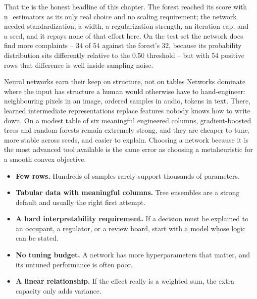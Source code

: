 That tie is the honest headline of this chapter. The forest reached its score
with \c{n_estimators} as its only real choice and no scaling requirement; the
network needed standardization, a width, a regularization strength, an
iteration cap, and a seed, and it repays none of that effort here. On the test
set the network does find more complaints -- 34 of 54 against the forest's 32,
because its probability distribution sits differently relative to the 0.50
threshold -- but with 54 positive rows that difference is well inside sampling
noise.

\begin{ExplainBox}{Neural networks earn their keep on structure, not on tables}
Networks dominate where the input has structure a human would otherwise have to
hand-engineer: neighbouring pixels in an image, ordered samples in audio, tokens
in text. There, learned intermediate representations replace features nobody
knows how to write down. On a modest table of six meaningful engineered columns,
gradient-boosted trees and random forests remain extremely strong, and they are
cheaper to tune, more stable across seeds, and easier to explain. Choosing a
network because it is the most advanced tool available is the same error as
choosing a metaheuristic for a smooth convex objective.
\end{ExplainBox}


\begin{itemize}
    \item \textbf{Few rows.} Hundreds of samples rarely support thousands of
          parameters.
    \item \textbf{Tabular data with meaningful columns.} Tree ensembles are a
          strong default and usually the right first attempt.
    \item \textbf{A hard interpretability requirement.} If a decision must be
          explained to an occupant, a regulator, or a review board, start with a
          model whose logic can be stated.
    \item \textbf{No tuning budget.} A network has more hyperparameters that
          matter, and its untuned performance is often poor.
    \item \textbf{A linear relationship.} If the effect really is a weighted sum,
          the extra capacity only adds variance.
\end{itemize}

\label{sec:c22-application}

